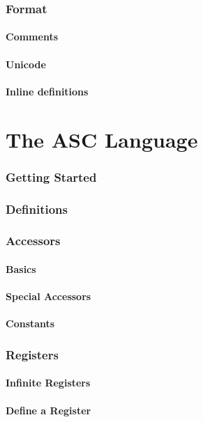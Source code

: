 \documentclass{scrartcl}
\begin{document}
    \section{Format}
        \subsection{Comments}
        \subsection{Unicode}
        \subsection{Inline definitions}
\part{The ASC Language}
    \section{Getting Started}
    \section{Definitions}
    \section{Accessors}
        \subsection{Basics}
        \subsection{Special Accessors}
        \subsection{Constants}
    \section{Registers}
        \subsection{Infinite Registers}
        \subsection{Define a Register}
\end{document}
